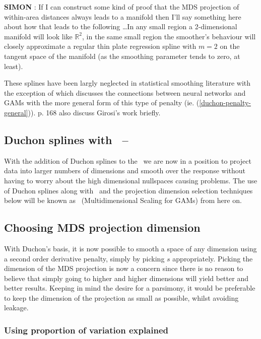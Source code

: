 \textbf{SIMON} : If I can construct some kind of proof that the MDS projection of within-area distances always leads to a manifold then I'll say something here about how that leads to the following \ldots In any small region a 2-dimensional manifold will look like $\mathbb{R}^2$, in the same small region the smoother's behaviour will closely approximate a regular thin plate regression spline with $m=2$ on the tangent space of the manifold (as the smoothing parameter tends to zero, at least).

These splines have been largly neglected in statistical smoothing literature with the exception of \cite{girosi} which discusses the connections between neural networks and GAMs with the more general form of this type of penalty (ie. (\ref{duchon-penalty-general})). \cite{elements} p. 168 also discuss Girosi's work briefly.

\subsection{Duchon splines with \mdsap\ -- \mdsds}

With the addition of Duchon splines to the \mdsap\ we are now in a position to project data into larger numbers of dimensions and smooth over the response without having to worry about the high dimensional nullspaces causing problems. The use of Duchon splines along with \mdsap\ and the projection dimension selection techniques below will be known as \mdsds\ (Multidimensional Scaling for GAMs) from here on.

\subsection{Choosing MDS projection dimension}

With Duchon's basis, it is now possible to smooth a space of any dimension using a second order derivative penalty, simply by picking $s$ appropriately. Picking the dimension of the MDS projection is now a concern since there is no reason to believe that simply going to higher and higher dimensions will yield better and better results. Keeping in mind the desire for a parsimony, it would be preferable to keep the dimension of the projection as small as possible, whilst avoiding leakage.

\subsubsection{Using proportion of variation explained}

